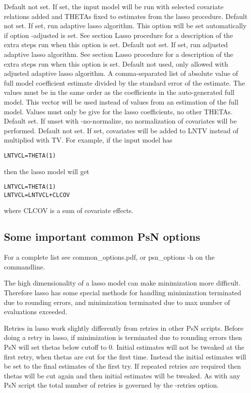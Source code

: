 \begin{optionlist}
\nextopt
{}
Default not set. If set, the input model will be run with selected covariate
relations added and THETAs fixed to estimates from the lasso procedure.
\nextopt
{}
Default not set. If set, run adaptive lasso algorithm. This option will be set automatically if option -adjusted is set.
See section Lasso procedure for a description of the extra steps run when this option is set.
\nextopt
{}
Default not set. If set, run adjusted adaptive lasso algorithm. See section Lasso procedure for a
description of the extra steps run when this option is set.
\nextopt
{}
Default not used, only allowed with adjusted adaptive lasso algorithm.
A comma-separated list of absolute value of full model coefficient estimate
divided by the standard error of the estimate.
The values must be in the same order as the coefficients in the auto-generated
full model. This vector will be used instead of values from an estimation of the full model.
Values must only be give for the lasso coefficients, no other THETAs.
\nextopt
{}
Default set. If unset with -no-normalize, no normalization of covariates will
be performed.
\nextopt
{}
Default not set. If set, covariates will be added to LNTV instead
of multiplied with TV. For example, if the input model has
\begin{verbatim}
LNTVCL=THETA(1)
\end{verbatim}
then the lasso model will get
\begin{verbatim}
LNTVCL=THETA(1)
LNTVCL=LNTVCL+CLCOV
\end{verbatim}
where CLCOV is a sum of covariate effects.
\nextopt
\end{optionlist}

\subsection{Some important common PsN options}
For a complete list see common\_options.pdf, 
or psn\_options -h on the commandline.

The high dimensionality of a lasso model can make minimization more difficult. Therefore lasso has some special methods for handling minimization terminated due to rounding errors, and minimization terminated due to max number of evaluations exceeded.

Retries in lasso work slightly differently from retries in other PsN scripts. Before doing a retry in lasso, if minimization is terminated due to rounding errors then PsN will set thetas below cutoff to 0. Initial estimates will not be tweaked at the first retry, when thetas are cut for the first time. Instead the initial estimates will be set to the final estimates of the first try. If repeated retries are required then thetas will be cut again and then initial estimates will be tweaked. As with any PsN script the total number of retries is governed by the -retries option. 

